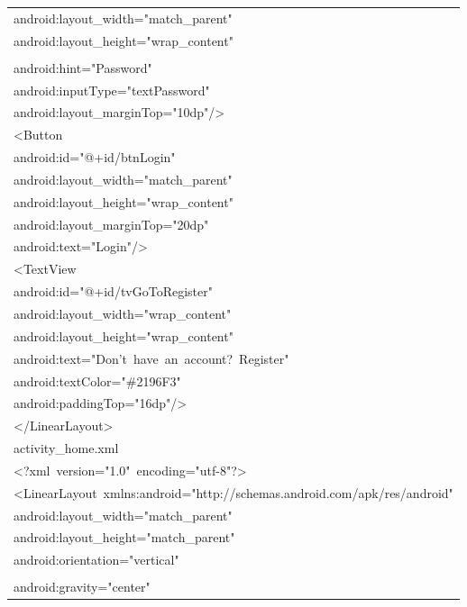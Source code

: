 \documentclass[a4paper,12pt]{article}
\begin{document}
\begin{longtable}{|p{}|}
{\ttfamily\small android:layout\_width="match\_parent"} \\
{\ttfamily\small android:layout\_height="wrap\_content"} \\
\strut \\
{\ttfamily\small android:hint="Password"} \\
{\ttfamily\small android:inputType="textPassword"} \\
{\ttfamily\small android:layout\_marginTop="10dp"/\textgreater{}} \\
{\ttfamily\small \textless{}Button} \\
{\ttfamily\small android:id="@+id/btnLogin"} \\
{\ttfamily\small android:layout\_width="match\_parent"} \\
{\ttfamily\small android:layout\_height="wrap\_content"} \\
{\ttfamily\small android:layout\_marginTop="20dp"} \\
{\ttfamily\small android:text="Login"/\textgreater{}} \\
{\ttfamily\small \textless{}TextView} \\
{\ttfamily\small android:id="@+id/tvGoToRegister"} \\
{\ttfamily\small android:layout\_width="wrap\_content"} \\
{\ttfamily\small android:layout\_height="wrap\_content"} \\
{\ttfamily\small android:text="Don't\ have\ an\ account?\ Register"} \\
{\ttfamily\small android:textColor="\#2196F3"} \\
{\ttfamily\small android:paddingTop="16dp"/\textgreater{}} \\
{\ttfamily\small \textless{}/LinearLayout\textgreater{}} \\
{\ttfamily\small activity\_home.xml} \\
{\ttfamily\small \textless{}?xml\ version="1.0"\ encoding="utf-8"?\textgreater{}} \\
{\ttfamily\small \textless{}LinearLayout\ xmlns:android="http://schemas.android.com/apk/res/android"} \\
{\ttfamily\small android:layout\_width="match\_parent"} \\
{\ttfamily\small android:layout\_height="match\_parent"} \\
{\ttfamily\small android:orientation="vertical"} \\
\strut \\
{\ttfamily\small android:gravity="center"} \\

\end{longtable}
\end{document}
